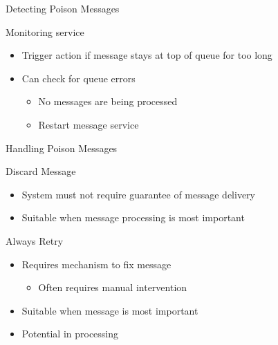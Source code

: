 \documentclass{slide}
\begin{document}
\begin{frame}{Detecting Poison Messages}
    \vspace{1mm}
    {\LARGE
        Monitoring service
        \begin{itemize}
            \Large\item Trigger action if message stays at top of queue for too long
            \vspace{2mm}
            \Large\item Can check for queue errors
            \begin{itemize}
                \large\item No messages are being processed
                \vspace{1mm}
                \large\item Restart message service
            \end{itemize}
        \end{itemize}
    }
\end{frame}

\begin{frame}{Handling Poison Messages}
    \vspace{1mm}
    {\LARGE
        Discard Message
        \begin{itemize}
            \Large\item System must not require guarantee of message delivery
            \Large\item Suitable when message processing  is most important
        \end{itemize}
        \pause
        \vspace{3mm}
        Always Retry
        \begin{itemize}
            \Large\item Requires mechanism to fix message
            \begin{itemize}
                \large\item Often requires manual intervention
            \end{itemize}
            \Large\item Suitable when message  is most important
            \Large\item Potential  in processing
        \end{itemize}
    }
\end{frame}
\end{document}
